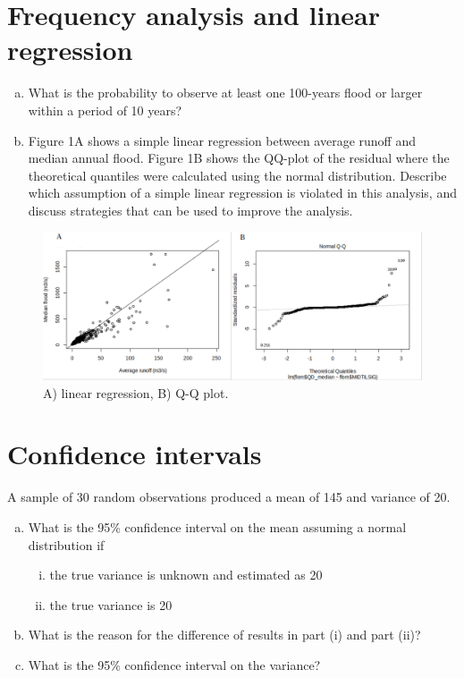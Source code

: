 \documentclass[12pt]{article}
\begin{document}
\section{Frequency analysis and linear regression}
\begin{enumerate}[(a)]
\item What is the probability to observe at least one 100-years flood or larger within a period of 10 years?
\item Figure 1A shows a simple linear regression between average runoff and median annual flood. Figure 1B shows the QQ-plot of the residual where the theoretical quantiles were calculated using the normal distribution. Describe which assumption of a simple linear regression is violated in this analysis, and discuss strategies that can be used to improve the analysis.
\end{enumerate}

\begin{figure}[h!]
    \centering
    \includegraphics[width=.8\textwidth]{fig01} 
    \caption{A) linear regression, B) Q-Q plot.}
\end{figure}


\pagebreak
\section{Confidence intervals}
A sample of 30 random observations produced a mean of 145 and variance of 20. 
\begin{enumerate}[(a)] 
    \item What is the 95\% confidence interval on the mean assuming a normal distribution if 
    \begin{enumerate}[(i)] 
        \item the true variance is unknown and estimated as 20
        \item the true variance is 20
     \end{enumerate}
    \item What is the reason for the difference of results in part (i) and part (ii)?
    \item What is the 95\% confidence interval on the variance?
\end{enumerate}
\end{document}
